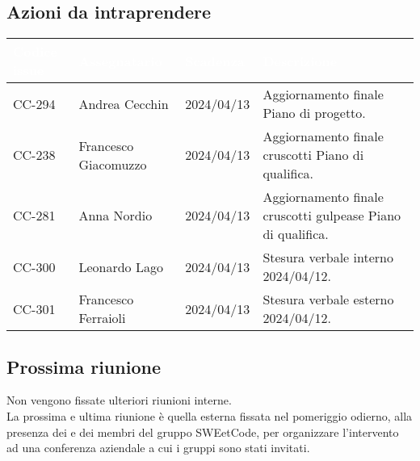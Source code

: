 \subsection{Azioni da intraprendere}
{
    \setlength{\tabcolsep}{10pt}
            \renewcommand{\arraystretch}{1.5}
            \begin{tabularx}{\textwidth}{| l | l | l | X |}
                 \hline
                 \rowcolor{headerrow}\textbf{\textcolor{white}{Codice issue}} & \textbf{\textcolor{white}{Assegnatario}} & \textbf{\textcolor{white}{Scadenza}} & \textbf{\textcolor{white}{Descrizione}} \\
                 \hline
                 CC-294 & Andrea Cecchin & 2024/04/13 & Aggiornamento finale Piano di progetto. \\
                 \hline
                 CC-238 & Francesco Giacomuzzo & 2024/04/13 & Aggiornamento finale cruscotti Piano di qualifica. \\
                 \hline
                 CC-281 & Anna Nordio & 2024/04/13 & Aggiornamento finale cruscotti gulpease Piano di qualifica. \\
                 \hline
                 CC-300 & Leonardo Lago & 2024/04/13 & Stesura verbale interno 2024/04/12. \\
                \hline
                CC-301 & Francesco Ferraioli & 2024/04/13 & Stesura verbale esterno 2024/04/12. \\
                \hline
            \end{tabularx}
}

\subsection{Prossima riunione} \label{subsec:riunione}
Non vengono fissate ulteriori riunioni interne.\\
La prossima e ultima riunione è quella esterna fissata nel pomeriggio odierno, alla presenza dei  e dei membri del gruppo SWEetCode, per organizzare l'intervento ad una conferenza aziendale a cui i gruppi sono stati invitati.